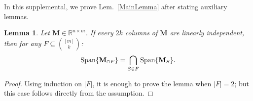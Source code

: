 \documentclass[9pt,twocolumn]{pnas-new}
\newtheorem{lemma}{Lemma}
\begin{document}
In this supplemental, we prove Lem.~\ref{MainLemma} after stating auxiliary lemmas.

\begin{lemma}\label{SpanIntersectionLemma}
Let $\mathbf{M} \in \mathbb{R}^{n \times m}$. If every $2k$ columns of $\mathbf{M}$ are linearly independent, then for any $F \subseteq {[m] \choose k}$:
\begin{align*}
\text{\rm Span}\{\mathbf{M}_{\cap F}\}  = \bigcap_{S \in F} \text{\rm Span}\{\mathbf{M}_S\}.
\end{align*}
\end{lemma}
\begin{proof}
Using induction on $|F|$, it is enough to prove the lemma when $|F| = 2$; but this case follows directly from the assumption.
\end{proof}
\end{document}
